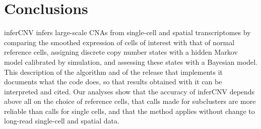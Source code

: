 \section{Conclusions}\label{sec:conclusions}

inferCNV infers large-scale CNAs from single-cell and spatial transcriptomes by comparing the smoothed expression of cells of interest with that of normal reference cells, assigning discrete copy number states with a hidden Markov model calibrated by simulation, and assessing these states with a Bayesian model. This description of the algorithm and of the release that implements it documents what the code does, so that results obtained with it can be interpreted and cited. Our analyses show that the accuracy of inferCNV depends above all on the choice of reference cells, that calls made for subclusters are more reliable than calls for single cells, and that the method applies without change to long-read single-cell and spatial data.
